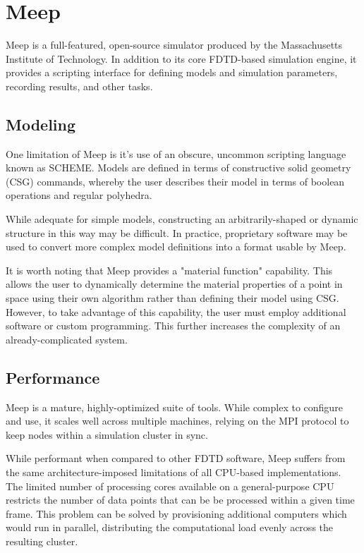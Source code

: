 \chapter{Meep} \label{ch:meep}

Meep\cite{OskooiRo10} is a full-featured, open-source simulator produced by the Massachusetts Institute of Technology. In addition to its core FDTD-based simulation engine, it provides a scripting interface for defining models and simulation parameters, recording results, and other tasks.  


\section{Modeling}

One limitation of Meep is it's use of an obscure, uncommon scripting language known as SCHEME. Models are defined in terms of constructive solid geometry (CSG) commands, whereby the user describes their model in terms of boolean operations and regular polyhedra. 

While adequate for simple models, constructing an arbitrarily-shaped or dynamic structure in this way may be difficult. In practice, proprietary software may be used to convert more complex model definitions into a format usable by Meep.

It is worth noting that Meep provides a "material function" capability. This allows the user to dynamically determine the material properties of a point in space using their own algorithm rather than defining their model using CSG. However, to take advantage of this capability, the user must employ additional software or custom programming. This further increases the complexity of an already-complicated system. 



\section{Performance}

Meep is a mature, highly-optimized suite of tools. While complex to configure and use, it scales well across multiple machines, relying on the MPI protocol to keep nodes within a simulation cluster in sync. 

While performant when compared to other FDTD software, Meep suffers from the same architecture-imposed limitations of all CPU-based implementations. The limited number of processing cores available on a general-purpose CPU restricts the number of data points that can be be processed within a given time frame. This problem can be solved by provisioning additional computers which would run in parallel, distributing the computational load evenly across the resulting cluster.

